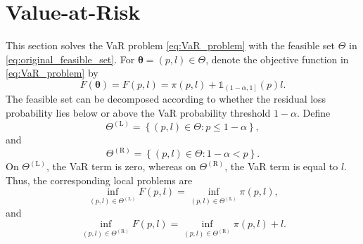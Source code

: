 \documentclass[a4paper,12pt]{article}
\begin{document}
\section{Value-at-Risk}\label{sec:VaR}
This section solves the VaR problem \eqref{eq:VaR_problem} with the feasible set $\Theta$ in \eqref{eq:original_feasible_set}. For ${\bm\theta}=\left(p,l\right)\in\Theta$, denote the objective function in \eqref{eq:VaR_problem} by
\begin{equation*}
F\left({\bm\theta}\right)=F\left(p,l\right)=\pi\left(p,l\right)+\mathds{1}_{\left(1-\alpha,1\right]}\left(p\right)l.
\end{equation*}
The feasible set can be decomposed according to whether the residual loss probability lies below or above the VaR probability threshold $1-\alpha$. Define
\begin{equation}
\Theta^{\left(\text{L}\right)}=\left\{\left(p,l\right)\in\Theta:p\leq 1-\alpha\right\},
\label{eq:Theta^L}
\end{equation}
and
\begin{equation}
\Theta^{\left(\text{R}\right)}=\left\{\left(p,l\right)\in\Theta:1-\alpha<p\right\}.
\label{eq:Theta^R}
\end{equation}
On $\Theta^{\left(\text{L}\right)}$, the VaR term is zero, whereas on $\Theta^{\left(\text{R}\right)}$, the VaR term is equal to $l$. Thus, the corresponding local problems are
\begin{equation}
\inf_{\left(p,l\right)\in\Theta^{\left(\text{L}\right)}}F(p,l)=\inf_{\left(p,l\right)\in\Theta^{\left(\text{L}\right)}}\pi\left(p,l\right),
\label{eq:VaR_problem<=}
\end{equation}
and
\begin{equation}
\inf_{\left(p,l\right)\in\Theta^{\left(\text{R}\right)}}F(p,l)=\inf_{\left(p,l\right)\in\Theta^{\left(\text{R}\right)}}\pi\left(p,l\right)+l.
\label{eq:VaR_problem>}
\end{equation}
\end{document}
